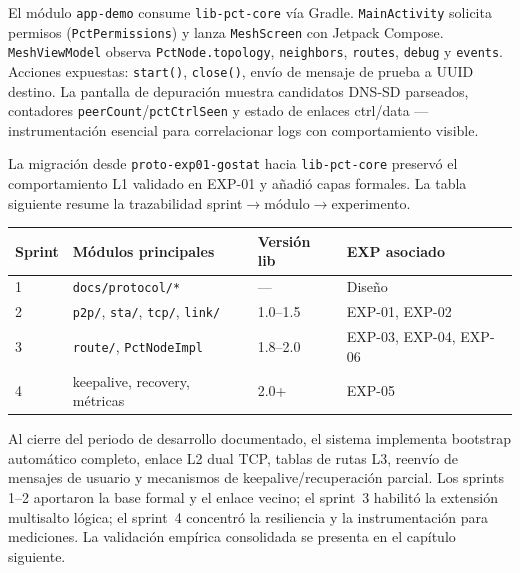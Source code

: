 
El módulo \texttt{app-demo} consume \texttt{lib-pct-core} vía Gradle. \texttt{MainActivity} solicita permisos (\texttt{PctPermissions}) y lanza \texttt{MeshScreen} con Jetpack Compose. \texttt{MeshViewModel} observa \texttt{PctNode.topology}, \texttt{neighbors}, \texttt{routes}, \texttt{debug} y \texttt{events}. Acciones expuestas: \texttt{start()}, \texttt{close()}, envío de mensaje de prueba a UUID destino. La pantalla de depuración muestra candidatos DNS-SD parseados, contadores \texttt{peerCount}/\texttt{pctCtrlSeen} y estado de enlaces ctrl/data — instrumentación esencial para correlacionar logs con comportamiento visible.


La migración desde \texttt{proto-exp01-gostat} hacia \texttt{lib-pct-core} preservó el comportamiento L1 validado en EXP-01 y añadió capas formales. La tabla siguiente resume la trazabilidad sprint$\rightarrow$módulo$\rightarrow$experimento.

\begin{center}
\small
\begin{tabular}{@{}p{1.8cm}p{4.2cm}p{3.2cm}p{3.8cm}@{}}
\hline
\textbf{Sprint} & \textbf{Módulos principales} & \textbf{Versión lib} & \textbf{EXP asociado} \\
\hline
1 & \texttt{docs/protocol/*} & — & Diseño \\
2 & \texttt{p2p/}, \texttt{sta/}, \texttt{tcp/}, \texttt{link/} & 1.0--1.5 & EXP-01, EXP-02 \\
3 & \texttt{route/}, \texttt{PctNodeImpl} & 1.8--2.0 & EXP-03, EXP-04, EXP-06 \\
4 & keepalive, recovery, métricas & 2.0+ & EXP-05 \\
\hline
\end{tabular}
\end{center}


Al cierre del periodo de desarrollo documentado, el sistema implementa bootstrap automático completo, enlace L2 dual TCP, tablas de rutas L3, reenvío de mensajes de usuario y mecanismos de keepalive/recuperación parcial. Los sprints 1--2 aportaron la base formal y el enlace vecino; el sprint~3 habilitó la extensión multisalto lógica; el sprint~4 concentró la resiliencia y la instrumentación para mediciones. La validación empírica consolidada se presenta en el capítulo siguiente.

